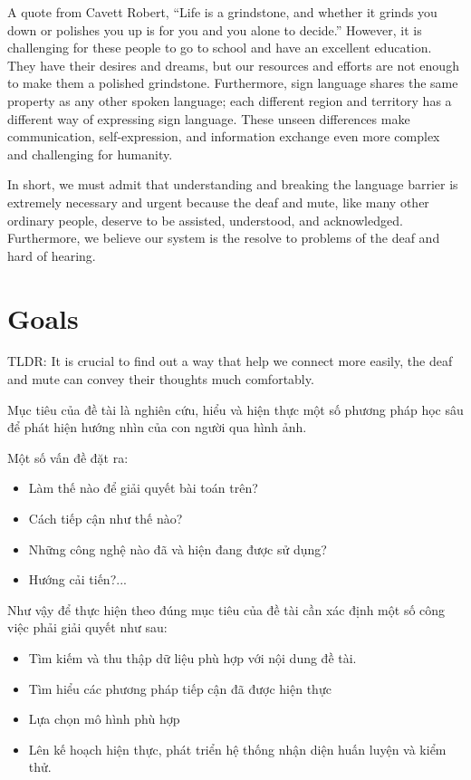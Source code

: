 A quote from Cavett Robert, “Life is a grindstone, and whether it grinds you down or polishes you up is for you and you alone to decide.” However, it is challenging for these people to go to school and have an excellent education. They have their desires and dreams, but our resources and efforts are not enough to make them a polished grindstone. Furthermore, sign language shares the same property as any other spoken language; each different region and territory has a different way of expressing sign language. These unseen differences make communication, self-expression, and information exchange even more complex and challenging for humanity.

In short, we must admit that understanding and breaking the language barrier is extremely necessary and urgent because the deaf and mute, like many other ordinary people, deserve to be assisted, understood, and acknowledged. Furthermore, we believe our system is the resolve to problems of the deaf and hard of hearing.

\section{Goals}

TLDR: It is crucial to find out a way that help we connect more easily, the deaf and mute can convey their thoughts much comfortably.

Mục tiêu của đề tài là nghiên cứu, hiểu và hiện thực một số phương pháp học sâu để phát hiện hướng nhìn của con người qua hình ảnh.

Một số vấn đề đặt ra: 
\begin{itemize}
  \item Làm thế nào để giải quyết bài toán trên?
  \item Cách tiếp cận như thế nào?
  \item Những công nghệ nào đã và hiện đang được sử dụng?
  \item Hướng cải tiến?...
\end{itemize}

Như vậy để thực hiện theo đúng mục tiêu của đề tài cần xác định một số công việc phải giải quyết như sau:
\begin{itemize}
  \item Tìm kiếm và thu thập dữ liệu phù hợp với nội dung đề tài.
  \item Tìm hiểu các phương pháp tiếp cận đã được hiện thực
  \item Lựa chọn mô hình phù hợp
  \item Lên kế hoạch hiện thực, phát triển hệ thống nhận diện huấn luyện và kiểm thử.
\end{itemize}

